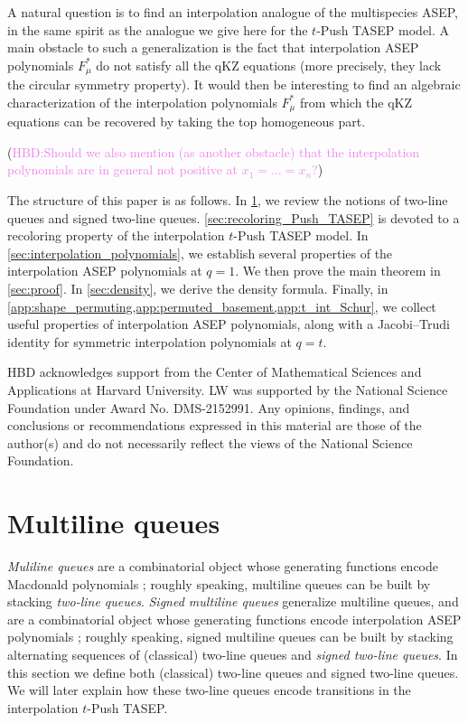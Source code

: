 \documentclass[12pt]{amsart}
\theoremstyle{definition}
\def\HBD#1{(\textcolor{violet}{HBD:#1})}
\begin{document}
A natural question is to find an interpolation analogue of the multispecies ASEP, in the same spirit as the analogue we give here for the $t$-Push TASEP model. A main obstacle to such a generalization is the fact that interpolation ASEP polynomials $F_\mu^*$ do not satisfy all the qKZ equations (more precisely, they lack the circular symmetry property). It would then be interesting to find an algebraic characterization of the interpolation polynomials $F_\mu^*$ from which the qKZ equations can be recovered by taking the top homogeneous part.

\HBD{Should we also mention (as another obstacle) that the interpolation polynomials are in general not positive at $x_1=\dots=x_n$?}

\medskip 

The structure of this paper is as follows. In \cref{sec:MLQ}, we review the notions of  two-line queues and signed two-line queues. \cref{sec:recoloring_Push_TASEP} is devoted to a recoloring property of the interpolation $t$-Push TASEP model. In \cref{sec:interpolation_polynomials}, we establish several properties of the interpolation ASEP polynomials at $q=1$.  We then prove the main theorem in \cref{sec:proof}. In \cref{sec:density}, we derive the density formula. Finally, in \cref{app:shape_permuting,app:permuted_basement,app:t_int_Schur}, we collect useful properties of interpolation ASEP polynomials, along with a Jacobi--Trudi identity for symmetric interpolation polynomials at $q=t$.



\bigskip
{}
HBD acknowledges support from the Center of Mathematical Sciences and Applications at Harvard University.
LW was supported by the National Science Foundation under Award No.
DMS-2152991.
Any opinions, findings, and conclusions or recommendations expressed in this material are
those of the author(s) and do not necessarily reflect the views of the National Science
Foundation.  


\section{Multiline queues}\label{sec:MLQ}

\emph{Muliline queues} are a combinatorial object whose generating functions
encode Macdonald polynomials \cite{CorteelMandelshtamWilliams2022}; roughly speaking, multiline queues can be built by stacking \emph{two-line queues}.
\emph{Signed multiline queues}
generalize multiline queues, and are a combinatorial object whose generating functions encode interpolation ASEP polynomials \cite{BenDaliWilliams2025}; roughly speaking, signed multiline queues 
can be built by stacking alternating sequences of (classical) two-line queues and \emph{signed two-line queues}.  
In this section we define both 
(classical) two-line queues and signed two-line queues.  We will later explain how these two-line queues encode transitions in the 
interpolation $t$-Push TASEP.
\end{document}
